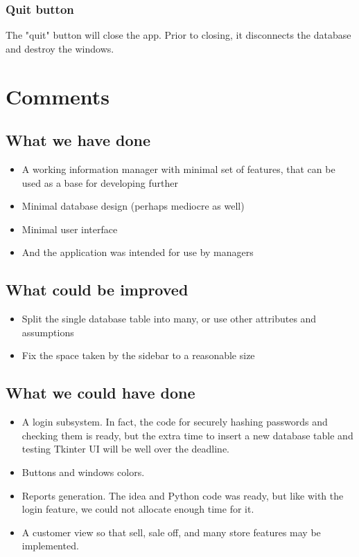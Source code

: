 \documentclass[12pt,oneside,a4paper]{article}
\begin{document}
\subsubsection{Quit button}
The "quit" button will close the app. Prior to closing, it disconnects the database and destroy the windows.

\newpage

\section{Comments}
\subsection{What we have done}
\begin{itemize}
  \item A working information manager with minimal set of features, that can be used as a base for developing further
  \item Minimal database design (perhaps mediocre as well)
  \item Minimal user interface
  \item And the application was intended for use by managers
\end{itemize}

\subsection{What could be improved}
\begin{itemize}
  \item Split the single database table into many, or use other attributes and assumptions
  \item Fix the space taken by the sidebar to a reasonable size
\end{itemize}

\subsection{What we could have done}
\begin{itemize}
  \item A login subsystem. In fact, the code for securely hashing passwords and checking them is ready, but the extra time to insert a new database table and testing Tkinter UI will be well over the deadline.
  \item Buttons and windows colors.
  \item Reports generation. The idea and Python code was ready, but like with the login feature, we could not allocate enough time for it.
  \item A customer view so that sell, sale off, and many store features may be implemented.
\end{itemize}
\end{document}
